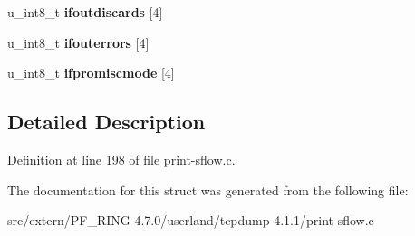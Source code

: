 \begin{DoxyCompactItemize}
\item 
\hypertarget{structsflow__generic__counter__t_a9108d341f951fa3235a636ddc3f6ed9e}{
u\_\-int8\_\-t {\bfseries ifoutdiscards} \mbox{[}4\mbox{]}}
\label{structsflow__generic__counter__t_a9108d341f951fa3235a636ddc3f6ed9e}

\item 
\hypertarget{structsflow__generic__counter__t_a2068ddf79030740b00672e69af69a2c1}{
u\_\-int8\_\-t {\bfseries ifouterrors} \mbox{[}4\mbox{]}}
\label{structsflow__generic__counter__t_a2068ddf79030740b00672e69af69a2c1}

\item 
\hypertarget{structsflow__generic__counter__t_a403bdfcc2b112b5cfd623793d170f286}{
u\_\-int8\_\-t {\bfseries ifpromiscmode} \mbox{[}4\mbox{]}}
\label{structsflow__generic__counter__t_a403bdfcc2b112b5cfd623793d170f286}

\end{DoxyCompactItemize}


\subsection{Detailed Description}


Definition at line 198 of file print-\/sflow.c.



The documentation for this struct was generated from the following file:\begin{DoxyCompactItemize}
\item 
src/extern/PF\_\-RING-\/4.7.0/userland/tcpdump-\/4.1.1/print-\/sflow.c\end{DoxyCompactItemize}

